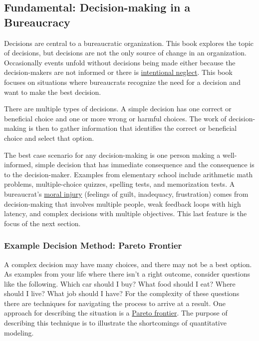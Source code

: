 \subsection*{Fundamental: Decision-making in a Bureaucracy\label{sec:decision-making}}

Decisions are central to a bureaucratic organization. This book explores the topic of decisions, but decisions are not the only source of change in an organization. Occasionally events unfold without decisions being made either because the decision-makers are not informed or there is  \href{https://en.wikipedia.org/wiki/Willful_blindness}{intentional neglect}. 
\iftoggle{WPinmargin}{\marginpar{$>$Wikipedia: Willful blindness}}{}
This book focuses on situations where bureaucrats recognize the need for a decision and want to make the best decision.

There are multiple types of decisions. 
A \gls{simple decision} \iftoggle{glossaryinmargin}{\marginpar{[Glossary]}}{}%
has one correct or beneficial choice and one or more wrong or harmful choices. The work of decision-making is then to gather information that identifies the correct or beneficial choice and select that option.

The best case scenario for any decision-making is one person making a well-informed, simple decision that has immediate consequence and the consequence is to the decision-maker. Examples from elementary school include arithmetic math problems, multiple-choice quizzes, spelling tests, and memorization tests. A bureaucrat's \href{https://en.wikipedia.org/wiki/Moral_injury}{moral injury}
\iftoggle{WPinmargin}{\marginpar{$>$Wikipedia: moral injury}}{}
(feelings of guilt, inadequacy, frustration)
comes from decision-making that involves multiple people, weak feedback loops with high latency, and complex decisions with multiple objectives. This last feature is the focus of the next section.

\subsubsection*{Example Decision Method: Pareto Frontier\label{sec:pareto}}

A complex decision may have many choices, and there may not be a best option. As examples from your life where there isn't a right outcome, consider questions like the following.
Which car should I buy? What food should I eat? Where should I live? What job should I have? 
For the complexity of these questions there are techniques for navigating the process to arrive at a result. One approach for describing the situation is a \href{https://en.wikipedia.org/wiki/Pareto_front}{Pareto frontier}. The purpose of describing this technique is to illustrate the shortcomings of quantitative modeling. 

